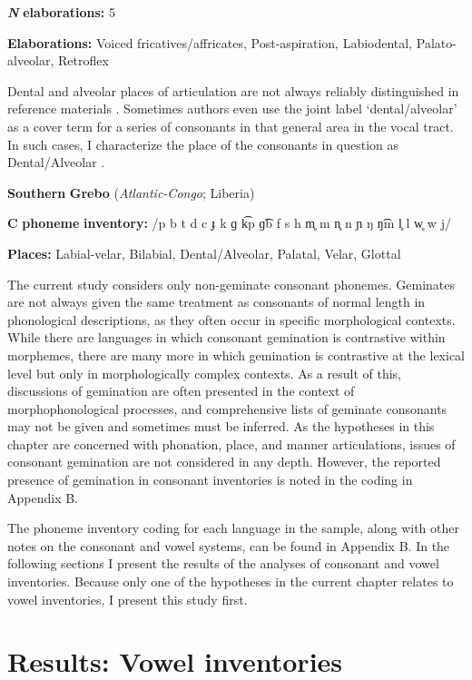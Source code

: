 \textbf{\textit{N}} \textbf{elaborations:} 5

\textbf{Elaborations:} Voiced fricatives/affricates, Post-aspiration, Labiodental, Palato-alveolar, Retroflex

\z

  Dental and alveolar places of articulation are not always reliably distinguished in reference materials \citep[31-32]{Maddieson1984}. Sometimes authors even use the joint label ‘dental/alveolar’ as a cover term for a series of consonants in that general area in the vocal tract. In such cases, I characterize the place of the consonants in question as Dental/Alveolar .

\ea\label{ex:(4.11)}
  \textbf{Southern} \textbf{Grebo} (\textit{Atlantic-Congo}; Liberia)

\textbf{C} \textbf{phoneme} \textbf{inventory:} /p b t d c ɟ k ɡ k͡p ɡ͡b f s h m̥ m n̥ n ɲ ŋ ŋ͡m l̥ l w̥ w j/

\textbf{Places:} Labial-velar, Bilabial, Dental/Alveolar, Palatal, Velar, Glottal

\z

  The current study considers only non-geminate consonant phonemes. Geminates are not always given the same treatment as consonants of normal length in phonological descriptions, as they often occur in specific morphological contexts. While there are languages in which consonant gemination is contrastive within morphemes, there are many more in which gemination is contrastive at the lexical level but only in morphologically complex contexts. As a result of this, discussions of gemination are often presented in the context of morphophonological processes, and comprehensive lists of geminate consonants may not be given and sometimes must be inferred. As the hypotheses in this chapter are concerned with phonation, place, and manner articulations, issues of consonant gemination are not considered in any depth. However, the reported presence of gemination in consonant inventories is noted in the coding in Appendix B.

  The phoneme inventory coding for each language in the sample, along with other notes on the consonant and vowel systems, can be found in Appendix B. In the following sections I present the results of the analyses of consonant and vowel inventories. Because only one of the hypotheses in the current chapter relates to vowel inventories, I present this study first.

\section{Results: Vowel inventories}\label{sec:4.3}

